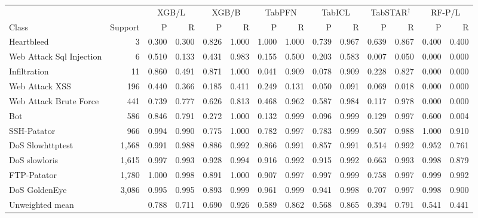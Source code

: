 \begin{tabular}{@{}lrrrrrrrrrrrrr@{}}
\toprule
 & & \multicolumn{2}{c}{XGB/L} & \multicolumn{2}{c}{XGB/B} & \multicolumn{2}{c}{TabPFN} & \multicolumn{2}{c}{TabICL} & \multicolumn{2}{c}{TabSTAR$^{\dagger}$} & \multicolumn{2}{c}{RF-P/L} \\
\cmidrule(lr){3-4}\cmidrule(lr){5-6}\cmidrule(lr){7-8}\cmidrule(lr){9-10}\cmidrule(lr){11-12}\cmidrule(lr){13-14}
Class & Support & P & R & P & R & P & R & P & R & P & R & P & R \\
\midrule
Heartbleed & 3 & 0.300 & 0.300 & 0.826 & 1.000 & 1.000 & 1.000 & 0.739 & 0.967 & 0.639 & 0.867 & 0.400 & 0.400 \\
Web Attack  Sql Injection & 6 & 0.510 & 0.133 & 0.431 & 0.983 & 0.155 & 0.500 & 0.203 & 0.583 & 0.007 & 0.050 & 0.000 & 0.000 \\
Infiltration & 11 & 0.860 & 0.491 & 0.871 & 1.000 & 0.041 & 0.909 & 0.078 & 0.909 & 0.228 & 0.827 & 0.000 & 0.000 \\
Web Attack  XSS & 196 & 0.440 & 0.366 & 0.185 & 0.411 & 0.249 & 0.131 & 0.050 & 0.091 & 0.069 & 0.018 & 0.000 & 0.000 \\
Web Attack  Brute Force & 441 & 0.739 & 0.777 & 0.626 & 0.813 & 0.468 & 0.962 & 0.587 & 0.984 & 0.117 & 0.978 & 0.000 & 0.000 \\
Bot & 586 & 0.846 & 0.791 & 0.272 & 1.000 & 0.132 & 0.999 & 0.096 & 0.999 & 0.129 & 0.997 & 0.600 & 0.004 \\
SSH-Patator & 966 & 0.994 & 0.990 & 0.775 & 1.000 & 0.782 & 0.997 & 0.783 & 0.999 & 0.507 & 0.988 & 1.000 & 0.910 \\
DoS Slowhttptest & 1,568 & 0.991 & 0.988 & 0.886 & 0.992 & 0.866 & 0.991 & 0.857 & 0.991 & 0.514 & 0.992 & 0.952 & 0.761 \\
DoS slowloris & 1,615 & 0.997 & 0.993 & 0.928 & 0.994 & 0.916 & 0.992 & 0.915 & 0.992 & 0.663 & 0.993 & 0.998 & 0.879 \\
FTP-Patator & 1,780 & 1.000 & 0.998 & 0.891 & 1.000 & 0.907 & 0.997 & 0.997 & 0.999 & 0.758 & 0.997 & 0.999 & 0.992 \\
DoS GoldenEye & 3,086 & 0.995 & 0.995 & 0.893 & 0.999 & 0.961 & 0.999 & 0.941 & 0.998 & 0.707 & 0.997 & 0.998 & 0.900 \\
\midrule
Unweighted mean & & 0.788 & 0.711 & 0.690 & 0.926 & 0.589 & 0.862 & 0.568 & 0.865 & 0.394 & 0.791 & 0.541 & 0.441 \\
\bottomrule
\end{tabular}

